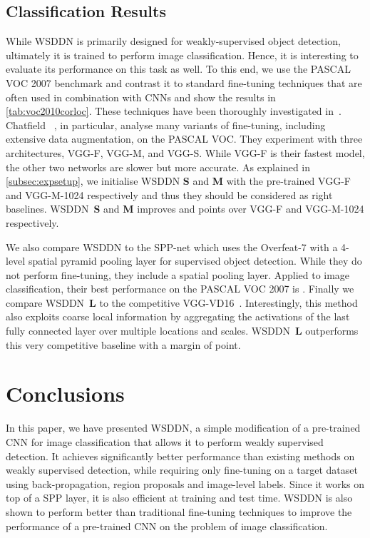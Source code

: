 \documentclass[10pt,twocolumn,letterpaper]{article}
\begin{document}
\subsection{Classification Results}
While WSDDN is primarily designed for weakly-supervised object detection, ultimately it is trained to perform image classification. Hence, it is interesting to evaluate its performance on this task as well. To this end, we use the PASCAL VOC 2007 benchmark and contrast it to standard fine-tuning techniques that are often used in combination with CNNs and show the results in \cref{tab:voc2010corloc}. These techniques have been thoroughly investigated in~\cite{Chatfield14,He14,Oquab14}. Chatfield \etal~\cite{Chatfield14}, in particular, analyse many variants of fine-tuning, including extensive data augmentation, on the PASCAL VOC. They experiment with three architectures, VGG-F, VGG-M, and VGG-S. While VGG-F is their fastest model, the other two networks are slower but more accurate. As explained in \ref{subsec:expsetup}, we initialise WSDDN \textbf{S} and \textbf{M} with the pre-trained VGG-F and VGG-M-1024 respectively and thus they should be considered as right baselines. WSDDN~\textbf{S} and \textbf{M} improves  and  points over VGG-F and VGG-M-1024 respectively. 


We also compare WSDDN to the SPP-net \cite{He14} which uses the Overfeat-7 \cite{Sermanet13} with a 4-level spatial pyramid pooling layer  for supervised object detection. While they do not perform fine-tuning, they include a spatial pooling layer. Applied to image classification, their best performance on the PASCAL VOC 2007 is . Finally we compare WSDDN~\textbf{L} to the competitive VGG-VD16~\cite{Simonyan15}. Interestingly, this method also exploits coarse local information by aggregating the activations of the last fully connected layer over multiple locations and scales. WSDDN~\textbf{L} outperforms this very competitive baseline with a margin of  point.

 
\section{Conclusions}\label{s:conclusions}
In this paper, we have presented WSDDN, a simple modification of a pre-trained CNN for image classification that allows it to perform weakly supervised detection. It achieves significantly better performance than existing methods on weakly supervised detection, while requiring only fine-tuning on a target dataset using back-propagation, region proposals and image-level labels. Since it works on top of a SPP layer, it is also efficient at training and test time. WSDDN is also shown to perform better than traditional fine-tuning techniques to improve the performance of a pre-trained CNN on the problem of image classification.
\end{document}
